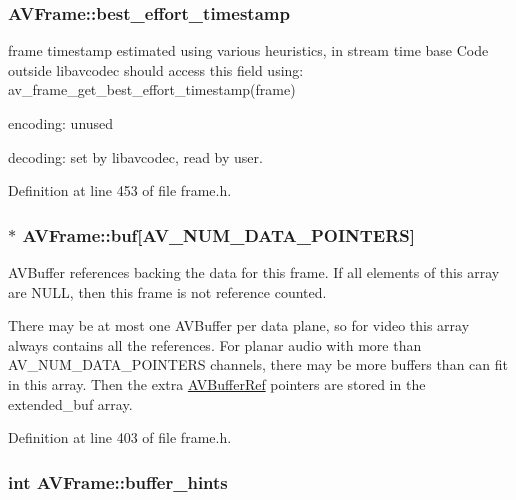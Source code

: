 \subsubsection[{\texorpdfstring{best\+\_\+effort\+\_\+timestamp}{best_effort_timestamp}}]{ A\+V\+Frame\+::best\+\_\+effort\+\_\+timestamp}\hypertarget{struct_a_v_frame_a0943e85eb624c2191490862ececd319d}{}\label{struct_a_v_frame_a0943e85eb624c2191490862ececd319d}
frame timestamp estimated using various heuristics, in stream time base Code outside libavcodec should access this field using\+: av\+\_\+frame\+\_\+get\+\_\+best\+\_\+effort\+\_\+timestamp(frame)
\begin{DoxyItemize}
\item encoding\+: unused
\item decoding\+: set by libavcodec, read by user. 
\end{DoxyItemize}

Definition at line 453 of file frame.\+h.

\subsubsection[{\texorpdfstring{buf}{buf}}]{$\ast$ A\+V\+Frame\+::buf\mbox{[}{\bf A\+V\+\_\+\+N\+U\+M\+\_\+\+D\+A\+T\+A\+\_\+\+P\+O\+I\+N\+T\+E\+RS}\mbox{]}}\hypertarget{struct_a_v_frame_a4a64d05cc676bfa8e18bf22d16c8a51f}{}\label{struct_a_v_frame_a4a64d05cc676bfa8e18bf22d16c8a51f}
A\+V\+Buffer references backing the data for this frame. If all elements of this array are N\+U\+LL, then this frame is not reference counted.

There may be at most one A\+V\+Buffer per data plane, so for video this array always contains all the references. For planar audio with more than A\+V\+\_\+\+N\+U\+M\+\_\+\+D\+A\+T\+A\+\_\+\+P\+O\+I\+N\+T\+E\+RS channels, there may be more buffers than can fit in this array. Then the extra \hyperlink{struct_a_v_buffer_ref}{A\+V\+Buffer\+Ref} pointers are stored in the extended\+\_\+buf array. 

Definition at line 403 of file frame.\+h.

\subsubsection[{\texorpdfstring{buffer\+\_\+hints}{buffer_hints}}]{ {\bf int} A\+V\+Frame\+::buffer\+\_\+hints}\hypertarget{struct_a_v_frame_a1d275de5af027f9f6b11748b2faf1102}{}\label{struct_a_v_frame_a1d275de5af027f9f6b11748b2faf1102}


